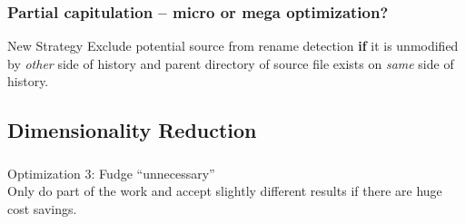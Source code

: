 \documentclass[compress,t]{beamer}
\begin{document}

\begin{frame}[fragile]
  \frametitle{Partial capitulation -- micro or mega optimization?}

  \vspace*{-1.5\baselineskip}
  \begin{center}
  \begin{minipage}{0.8\textwidth}
  \begin{block}{New Strategy}
    Exclude potential source from rename detection \textbf{if} it is
    unmodified by \textit{other} side of history and parent directory
    of source file exists on \textit{same} side of history.
  \end{block}
  \end{minipage}
  \end{center}


\end{frame}


\subsection[Linearizing]{Dimensionality Reduction}
\begin{frame}
  \frametitle{}

  \vfill
  {\Large
  \begin{center}
    Optimization 3: Fudge ``unnecessary''\\
    \vspace*{\baselineskip}
    \pause
    Only do part of the work and accept slightly different results if
    there are huge cost savings.
  \end{center}
  }
  \vfill
\end{frame}
\end{document}
